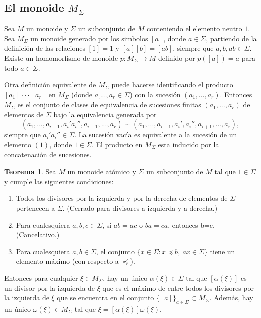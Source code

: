 \documentclass[12pt]{book}
\theoremstyle{definition}
\newtheorem{teor}{Teorema}[section]
\begin{document}
\subsection{El monoide $M_\Sigma$} 

Sea $M$ un monoide y $\Sigma$ un subconjunto de $M$ conteniendo el elemento neutro $1$. Sea $M_\Sigma$ un monoide generado por los simbolos $[a]$, donde $a\in \Sigma$, partiendo de la definición de las relaciones $[1]=1$ y $[a][b]=[ab]$, siempre que $a,b,ab\in\Sigma$. Existe un homomorfismo de monoide $p:M_\Sigma\rightarrow M$ definido por $p([a])=a$ para todo $a\in\Sigma$.

Otra definición equivalente de $M_\Sigma$ puede hacerse identificando el producto $[a_1]\cdot\cdot\cdot[a_r]$ en $M_\Sigma$ (donde $a_,...,a_r\in \Sigma$) con la sucesión $(a_1,...,a_r)$. Entonces $M_\Sigma$ es el conjunto de clases de equivalencia de sucesiones finitas $(a_1,...,a_r)$ de elementos de $\Sigma$ bajo la equivalencia generada por
$$(a_1,...,a_{i-1}, a_i'a_i'',a_{i+1},...,a_r)\sim (a_1,...,a_{i-1}, a_i',a_i'',a_{i+1},...,a_r),$$
siempre que $a_i'a_i''\in\Sigma$. La sucesión vacía es equivalente a la sucesión de un elemento $(1)$, donde $1\in\Sigma$. El producto en $M_\Sigma$ esta inducido por la concatenación de sucesiones.


\begin{teor}
\label{teor:monoi_deriv}
Sea $M$ un monoide atómico y $\Sigma$ un subconjunto de $M$ tal que $1\in \Sigma$ y cumple las siguientes condiciones:
\begin{enumerate}
\item Todos los divisores por la izquierda y por la derecha de elementos de $\Sigma$ pertenecen a $\Sigma$. (Cerrado para divisores a izquierda y a derecha.)
\item Para cualesquiera $a,b,c\in \Sigma$, si $ab=ac$ o $ba=ca$, entonces b=c. (Cancelativo.)
\item Para cualesquiera $a,b\in \Sigma$, el conjunto $\{x\in\Sigma:x\preceq b,\ ax\in\Sigma\}$ tiene un elemento máximo (con respecto a $\preceq$).
\end{enumerate}
Entonces para cualquier $\xi\in M_\Sigma$, hay un único $\alpha(\xi)\in\Sigma$ tal que $[\alpha(\xi)]$ es un divisor por la izquierda de $\xi$ que es el máximo de entre todos los divisores por la izquierda de $\xi$ que se encuentra en el conjunto $\{[a]\}_{a\in\Sigma}\subset M_\Sigma$. Además, hay un único $\omega(\xi)\in M_\Sigma$ tal que $\xi=[\alpha(\xi)]\omega(\xi)$.
\end{teor}
\end{document}
